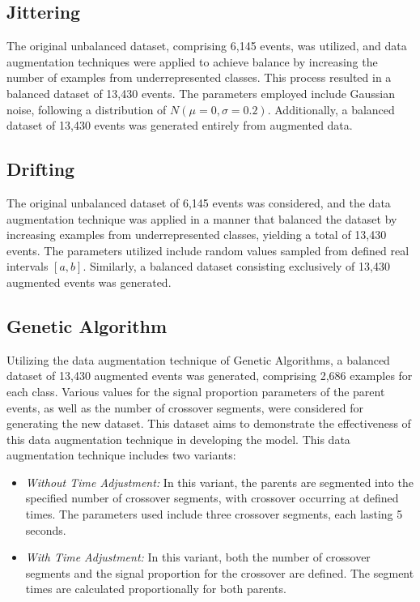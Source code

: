 \documentclass[journal]{IEEEtran}
\begin{document}
\subsection{Jittering}
The original unbalanced dataset, comprising 6,145 events, was utilized, and data augmentation techniques were applied to achieve balance by increasing the number of examples from underrepresented classes. This process resulted in a balanced dataset of 13,430 events.
The parameters employed include Gaussian noise, following a distribution of \(N(\mu=0, \sigma=0.2)\). Additionally, a balanced dataset of 13,430 events was generated entirely from augmented data.
\subsection{Drifting}
The original unbalanced dataset of 6,145 events was considered, and the data augmentation technique was applied in a manner that balanced the dataset by increasing examples from underrepresented classes, yielding a total of 13,430 events.
The parameters utilized include random values sampled from defined real intervals \([a,b]\). Similarly, a balanced dataset consisting exclusively of 13,430 augmented events was generated.
\subsection{Genetic Algorithm}
Utilizing the data augmentation technique of Genetic Algorithms, a balanced dataset of 13,430 augmented events was generated, comprising 2,686 examples for each class. Various values for the signal proportion parameters of the parent events, as well as the number of crossover segments, were considered for generating the new dataset. This dataset aims to demonstrate the effectiveness of this data augmentation technique in developing the model.
This data augmentation technique includes two variants:
\begin{itemize}
  \item \textit{Without Time Adjustment:} In this variant, the parents are segmented into the specified number of crossover segments, with crossover occurring at defined times. The parameters used include three crossover segments, each lasting 5 seconds.
  \item \textit{With Time Adjustment:} In this variant, both the number of crossover segments and the signal proportion for the crossover are defined. The segment times are calculated proportionally for both parents.
\end{itemize}
\end{document}
